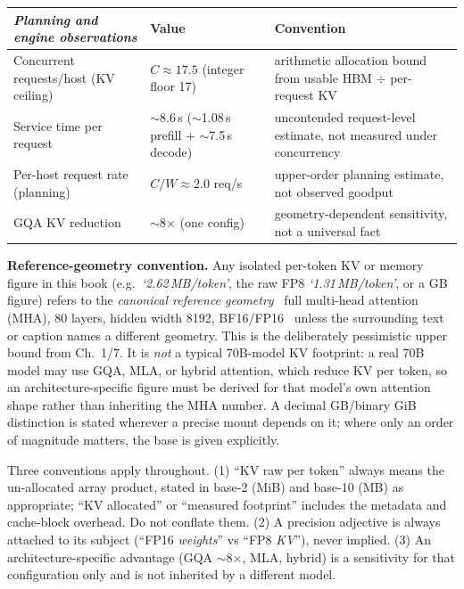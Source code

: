 \noindent\begin{tabularx}{\textwidth}{@{}>{\raggedright\arraybackslash}p{1.85in} >{\raggedright\arraybackslash}p{2.05in} >{\raggedright\arraybackslash}X@{}}
\toprule
\emph{Planning and engine observations} & \textbf{Value} & \textbf{Convention}\\
\midrule
Concurrent requests/host (KV ceiling) & $C \approx 17.5$ (integer floor 17) & arithmetic allocation bound from usable HBM $\div$ per-request KV\\
Service time per request & $\sim$8.6\,s ($\sim$1.08\,s prefill + $\sim$7.5\,s decode) & uncontended request-level estimate, not measured under concurrency\\
Per-host request rate (planning) & $C/W \approx 2.0$ req/s & upper-order planning estimate, not observed goodput\\
GQA KV reduction & $\sim$8$\times$ (one config) & geometry-dependent sensitivity, not a universal fact\\
\bottomrule
\end{tabularx}

\noindent\textbf{Reference-geometry convention.} Any isolated per-token KV or memory figure in this book (e.g.~\emph{`2.62\,MB/token'}, the raw FP8 \emph{`1.31\,MB/token'}, or a GB figure) refers to the \emph{canonical reference geometry} \textemdash\ full multi-head attention (MHA), 80 layers, hidden width 8192, BF16/FP16 \textemdash\ unless the surrounding text or caption names a different geometry. This is the deliberately pessimistic upper bound from Ch.~1/7. It is \emph{not} a typical 70B-model KV footprint: a real 70B model may use GQA, MLA, or hybrid attention, which reduce KV per token, so an architecture-specific figure must be derived for that model's own attention shape rather than inheriting the MHA number. A decimal GB/binary GiB distinction is stated wherever a precise mount depends on it; where only an order of magnitude matters, the base is given explicitly.

\noindent Three conventions apply throughout. (1) ``KV raw per token'' always means the un-allocated array product, stated in base-2 (MiB) and base-10 (MB) as appropriate; ``KV allocated'' or ``measured footprint'' includes the metadata and cache-block overhead. Do not conflate them. (2) A precision adjective is always attached to its subject (``FP16 \emph{weights}'' vs ``FP8 \emph{KV}''), never implied. (3) An architecture-specific advantage (GQA $\sim$8$\times$, MLA, hybrid) is a sensitivity for that configuration only and is not inherited by a different model.

